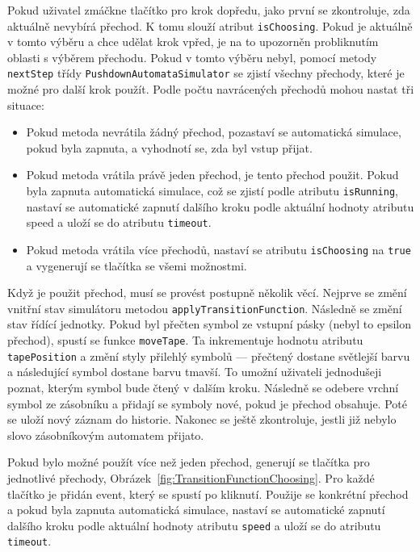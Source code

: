 Pokud uživatel zmáčkne tlačítko pro krok dopředu, jako první se zkontroluje, zda aktuálně nevybírá přechod. K tomu slouží atribut \texttt{isChoosing}. Pokud je aktuálně v tomto výběru a chce udělat krok vpřed, je na to upozorněn probliknutím oblasti s výběrem přechodu. Pokud v tomto výběru nebyl, pomocí metody \texttt{nextStep} třídy \texttt{PushdownAutomataSimulator} se zjistí všechny přechody, které je možné pro další krok použít. Podle počtu navrácených přechodů mohou nastat tři situace:
\begin{itemize}
    \item Pokud metoda nevrátila žádný přechod, pozastaví se automatická simulace, pokud byla zapnuta, a vyhodnotí se, zda byl vstup přijat.
    \item  Pokud metoda vrátila právě jeden přechod, je tento přechod použit. Pokud byla zapnuta automatická simulace, což se zjistí podle atributu \texttt{isRunning}, nastaví se automatické zapnutí dalšího kroku podle aktuální hodnoty atributu speed a uloží se do atributu \texttt{timeout}.
    \item Pokud metoda vrátila více přechodů, nastaví se atributu \texttt{isChoosing} na \texttt{true} a vygenerují se tlačítka se všemi možnostmi.
\end{itemize}

Když je použit přechod, musí se provést postupně několik věcí. Nejprve se změní vnitřní stav simulátoru metodou \texttt{applyTransitionFunction}. Následně se změní stav řídící jednotky. Pokud byl přečten symbol ze vstupní pásky (nebyl to epsilon přechod), spustí se funkce \texttt{moveTape}. Ta inkrementuje hodnotu atributu \texttt{tapePosition} a změní styly přilehlý symbolů --- přečtený dostane světlejší barvu a následující symbol dostane barvu tmavší. To umožní uživateli jednodušeji poznat, kterým symbol bude čtený v dalším kroku. Následně se odebere vrchní symbol ze zásobníku a přidají se symboly nové, pokud je přechod obsahuje. Poté se uloží nový záznam do historie. Nakonec se ještě zkontroluje, jestli již nebylo slovo zásobníkovým automatem přijato.

Pokud bylo možné použít více než jeden přechod, generují se tlačítka pro jednotlivé přechody, Obrázek~\ref{fig:TransitionFunctionChoosing}. Pro každé tlačítko je přidán event, který se spustí po kliknutí. Použije se konkrétní přechod a pokud byla zapnuta automatická simulace, nastaví se automatické zapnutí dalšího kroku podle aktuální hodnoty atributu \texttt{speed} a uloží se do atributu \texttt{timeout}.

